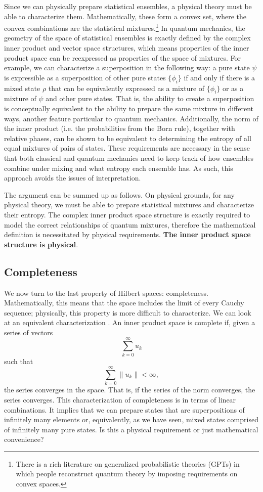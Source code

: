 \documentclass[10pt,twocolumn, nofootinbib]{revtex4-2}
\begin{document}
Since we can physically prepare statistical ensembles, a physical theory must be able to characterize them. Mathematically, these form a convex set, where the convex combinations are the statistical mixtures.\footnote{There is a rich literature on generalized probabilistic theories (GPTs) in which people reconstruct quantum theory by imposing requirements on convex spaces.\cite{gpt_overview_2021}} In quantum mechanics, the geometry of the space of statistical ensembles is exactly defined by the complex inner product and vector space structures, which means properties of the inner product space can be reexpressed as properties of the space of mixtures. For example, we can characterize a superposition in the following way: a pure state $\psi$ is expressible as a superposition of other pure states $\{\phi_i\}$ if and only if there is a mixed state $\rho$ that can be equivalently expressed as a mixture of $\{\phi_i\}$ or as a mixture of $\psi$ and other pure states. That is, the ability to create a superposition is conceptually equivalent to the ability to prepare the same mixture in different ways, another feature particular to quantum mechanics. Additionally, the norm of the inner product (i.e. the probabilities from the Born rule), together with relative phases, can be shown to be equivalent to determining the entropy of all equal mixtures of pairs of states. These requirements are necessary in the sense that both classical and quantum mechanics need to keep track of how ensembles combine under mixing and what entropy each ensemble has. As such, this approach avoids the issues of interpretation.

The argument can be summed up as follows. On physical grounds, for any physical theory, we must be able to prepare statistical mixtures and characterize their entropy. The complex inner product space structure is exactly required to model the correct relationships of quantum mixtures, therefore the mathematical definition is necessitated by physical requirements. \textbf{The inner product space structure is physical}.

\subsection{Completeness}

We now turn to the last property of Hilbert spaces: completeness. Mathematically, this means that the space includes the limit of every Cauchy sequence; physically, this property is more difficult to characterize. We can look at an equivalent characterization \cite[Theorem 13.8]{roman_2008}. An inner product space is complete if, given a series of vectors
$$ \sum _{k=0}^{\infty }u_{k}$$
such that
$$ \sum _{k=0}^{\infty }\|u_{k}\|<\infty,$$
the series converges in the space. That is, if the series of the norm converges, the series converges. This characterization of completeness is in terms of linear combinations. It implies that we can prepare states that are superpositions of infinitely many elements or, equivalently, as we have seen, mixed states comprised of infinitely many pure states. Is this a physical requirement or just mathematical convenience?
\end{document}
